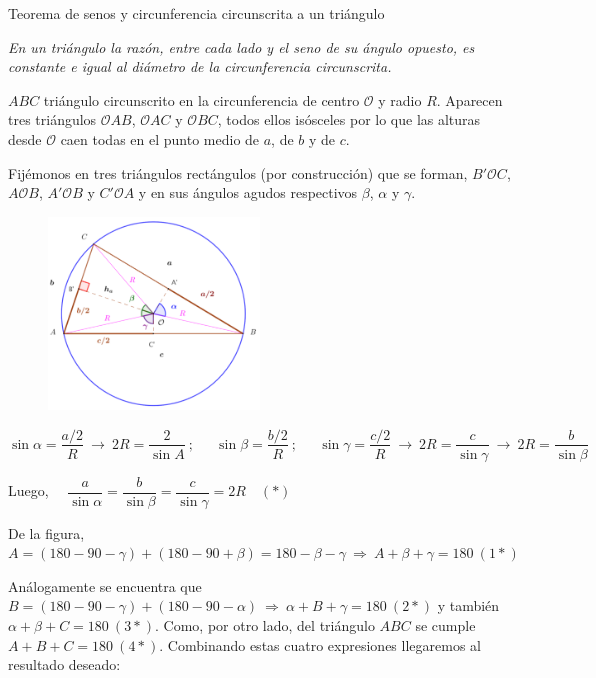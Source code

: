 \vspace{5mm}
\begin{myalertblock}{Teorema de senos y circunferencia circunscrita a un triángulo}

\emph{En un triángulo la razón, entre cada lado y el seno de su ángulo opuesto, es constante e igual al diámetro de la circunferencia circunscrita.}

\begin{multicols}{2}	
 $ABC$ triángulo circunscrito en la circunferencia de centro $\mathcal O$ y radio $R$. Aparecen tres triángulos $\mathcal OAB$, $\mathcal OAC$ y $\mathcal OBC$, todos ellos isósceles por lo que las alturas desde $\mathcal O$ caen todas en el punto medio de $a$, de $b$ y de $c$.

\vspace{4mm}Fijémonos en tres triángulos rectángulos (por construcción) que se forman, $B'\mathcal O C$, $A\mathcal O B$, $A'\mathcal O B$ y $C'\mathcal O A$ y en sus ángulos agudos respectivos $\beta$, $\alpha$ y $\gamma$.

	\begin{figure}[H]
	\centering
	\includegraphics[width=0.5\textwidth]{img-triang/triang07.png}
\end{figure}
\end{multicols}
$\sin \alpha= \dfrac{a/2}{R} \ \to \ 2R=\dfrac{2}{\sin A} \ ; \ \quad \ \sin \beta= \dfrac{b/2}{R} \ ; \ \quad \ \sin \gamma=\dfrac{c/2}{R} \ \to \ 2R=\dfrac{c}{\sin \gamma} \ \to \ 2R=\dfrac{b}{\sin \beta}$

\vspace{2mm} Luego, $ \quad \dfrac{a}{\sin \alpha}=\dfrac{b}{\sin \beta}=\dfrac{c}{\sin \gamma}=2R \quad (*)$

\vspace{2mm} De la figura, $A=(180-90-\gamma)+(180-90+\beta)=180-\beta-\gamma \ \Rightarrow \ A+\beta+\gamma=180 \ (1*)$

\vspace{2mm} Análogamente se encuentra que $B=(180-90-\gamma)+(180-90-\alpha) \ \Rightarrow \ \alpha+B+\gamma=180 \ (2*)$ y también $\alpha+\beta+C=180 \ (3*)$. Como, por otro lado, del triángulo $ABC$ se cumple $A+B+C=180 \ (4*)$. Combinando estas cuatro expresiones llegaremos al resultado deseado:


\end{myalertblock}
